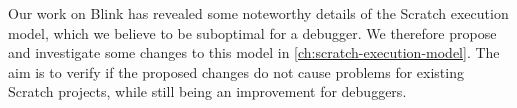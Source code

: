 \documentclass[./main]{subfiles}
\begin{document}
Our work on Blink has revealed some noteworthy details of the Scratch execution model, which we believe to be suboptimal for a debugger.
We therefore propose and investigate some changes to this model in \cref{ch:scratch-execution-model}.
The aim is to verify if the proposed changes do not cause problems for existing Scratch projects, while still being an improvement for debuggers.


%
%
\end{document}
